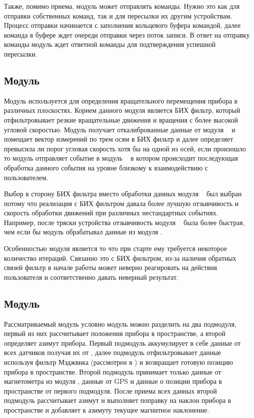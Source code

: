Также, помимо приема, модуль может отправлять команды. Нужно это как для отправки собственных команд, так и для пересылки их другим устройствам.
Процесс отправки начинается с заполнения кольцевого буфера командой, далее команда в буфере ждет очереди отправки через поток записи. В ответ на отправку
команды модуль ждет ответной команды для подтверждения успешной пересылки.


\subsection{Модуль \moduleMoveDetect}

Модуль используется для определения вращательного перемещения прибора в различных плоскостях. Корнем данного модуля является
БИХ фильтр, который отфильтровывает резкие вращательные движения и вращения с более высокой угловой скоростью.
Модуль получает откалиброванные данные от модуля \moduleCalib~ и помещает вектор измерений по трем осям в БИХ фильтр
и далее определяет превысила ли порог угловая скорость хотя бы на одной из осей, если произошло то модуль отправляет событие 
в модуль \moduleGraphics~ в котором происходит последующая обработка данного события на уровне близкому к взаимодействию с пользователем.

Выбор в сторону БИХ фильтра вместо обработки данных модуля \moduleOrientationAzimuth~ был выбран потому что реализация 
с БИХ фильтром давала более лучшую отзывчивость и скорость обработки движений при различных нестандартных событиях.
Например, после тряски устройства отзывчивость модуля \moduleMoveDetect~ была более быстрая, чем если бы модуль обрабатывал
данные из модуля \moduleOrientationAzimuth. 

Особенностью модуля является то что при старте ему требуется некоторое количество итераций. Связанно это с БИХ фильтром, из-за наличия
обратных связей фильтр в начале работы может неверно реагировать на действия пользователя и соответственно давать неверный результат.

\subsection{Модуль \moduleOrientationAzimuth}

Рассматриваемый модуль условно модуль можно разделить на два подмодуля, первый из них рассчитывает положения прибора в пространстве,
а второй определяет азимут прибора. Первый подмодуль аккумулирует в себе данные от всех датчиков получая их от \moduleCalib, 
далее подмодуль отфильтровывает данные используя фильтр Мэджвика (рассмотрен в ) и возвращает готовую позицию прибора в пространстве.
Второй подмодуль принимает только данные от магнетометра из модуля \moduleCalib, данные от GPS и данные о позиции прибора в пространстве
от первого подмодуля.
После приема всех данных второй подмодуль рассчитывает азимут и выполняет поправку на наклон прибора в 
пространстве и добавляет к азимуту текущее магнитное наклонение.

